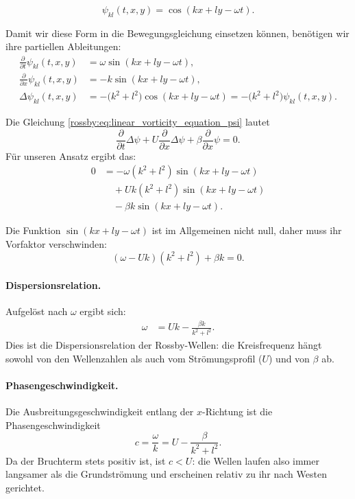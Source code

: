 \begin{equation}
	\psi_{kl}(t,x,y) = \cos(kx + ly - \omega t).
	\label{rossby:ebenewelle}
\end{equation}

Damit wir diese Form in die Bewegungsgleichung einsetzen können,
benötigen wir ihre partiellen Ableitungen:
\begin{align*}
	\frac{\partial}{\partial t} \psi_{kl}(t,x,y)
	 & = \omega \sin(kx+ly-\omega t),
	\\[0.5em]
	\frac{\partial}{\partial x} \psi_{kl}(t,x,y)
	 & = -k \sin(kx+ly-\omega t),
	\\[0.5em]
	\Delta\psi_{kl}(t,x,y)
	 & = -\bigl(k^2+l^2\bigr)\cos(kx+ly-\omega t)
	= -\bigl(k^2+l^2\bigr)\psi_{kl}(t,x,y).
\end{align*}

Die Gleichung  \eqref{rossby:eq:linear_vorticity_equation_psi} lautet
\[
	\frac{\partial}{\partial t}\Delta \psi
	+ U \frac{\partial}{\partial x}\Delta \psi
	+ \beta \frac{\partial}{\partial x} \psi = 0.
\]
Für unseren Ansatz ergibt das:
\begin{align*}
	0
	 & = -\omega (k^2+l^2)\sin(kx+ly-\omega t)
	\\&\quad
	+ U k (k^2+l^2)\sin(kx+ly-\omega t)
	\\&\quad
	- \beta k \sin(kx+ly-\omega t).
\end{align*}

Die Funktion $\sin(kx+ly-\omega t)$ ist im Allgemeinen nicht null,
daher muss ihr Vorfaktor verschwinden:
\[
	(\omega - Uk)(k^2+l^2) + \beta k = 0.
\]

\paragraph{Dispersionsrelation.}
Aufgelöst nach $\omega$ ergibt sich:
\begin{align}
	\omega
	 & = Uk - \frac{\beta k}{k^2+l^2}.
	\label{rossby:dispersion}
\end{align}
Dies ist die Dispersionsrelation der Rossby-Wellen:
die Kreisfrequenz hängt sowohl von den Wellenzahlen
als auch vom Strömungsprofil ($U$) und von $\beta$ ab.

\paragraph{Phasengeschwindigkeit.}
Die Ausbreitungsgeschwindigkeit entlang der $x$-Richtung ist die
Phasengeschwindigkeit
\begin{equation}
	c = \frac{\omega}{k} = U - \frac{\beta}{k^2+l^2}.
	\label{rossby:phasengeschwindigkeit}
\end{equation}
Da der Bruchterm stets positiv ist, ist $c < U$:
die Wellen laufen also immer langsamer als die Grundströmung
und erscheinen relativ zu ihr nach Westen gerichtet.

